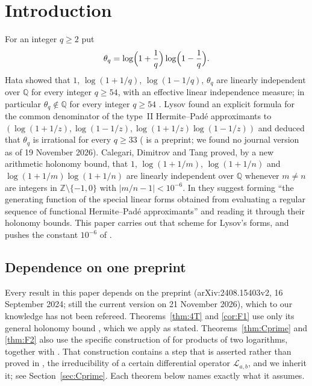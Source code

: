 \documentclass[11pt]{amsart}
\theoremstyle{definition}
\theoremstyle{remark}
\numberwithin{equation}{section}
\newcommand{\ZZ}{\mathbb{Z}}
\newcommand{\QQ}{\mathbb{Q}}
\begin{document}
\section{Introduction}\label{sec:intro}

For an integer $q\ge2$ put
\[
\theta_q=\log\Bigl(1+\frac1q\Bigr)\log\Bigl(1-\frac1q\Bigr).
\]
Hata \cite[Cor.~6.3]{Hat98} showed that $1$, $\log(1+1/q)$, $\log(1-1/q)$, $\theta_q$ are linearly independent over
$\QQ$ for every integer $q\ge54$, with an effective linear independence measure; in particular $\theta_q\notin\QQ$ for
every integer $q\ge54$ \cite[Thm.~0.1]{Hat98}. Lysov \cite{Lys18} found an explicit formula for the common
denominator of the type~II Hermite--Pad\'e approximants to $(\log(1+1/z),\log(1-1/z),\log(1+1/z)\log(1-1/z))$ and
deduced that $\theta_q$ is irrational for every $q\ge33$ \cite{Lys18,Lys19} (\cite{Lys18} is a preprint; we found no
journal version as of 19 November 2026). Calegari, Dimitrov and Tang
\cite[Thm.~C, Thm.~14.0.1]{CDT} proved, by a new arithmetic holonomy bound, that $1$, $\log(1+1/m)$, $\log(1+1/n)$ and
$\log(1+1/m)\log(1+1/n)$ are linearly independent over $\QQ$ whenever $m\ne n$ are integers in $\ZZ\setminus\{-1,0\}$
with $|m/n-1|<10^{-6}$. In \cite[\S15.1.10]{CDT} they suggest forming ``the generating function of the special linear
forms obtained from evaluating a regular sequence of functional Hermite--Pad\'e approximants'' and reading it through
their holonomy bounds. This paper carries out that scheme for Lysov's forms, and pushes the constant $10^{-6}$ of
\cite[Thm.~C]{CDT}.

\subsection*{Dependence on one preprint}
Every result in this paper depends on the preprint \cite{CDT} (arXiv:2408.15403v2, 16 September 2024; still the current
version on 21 November 2026), which to our knowledge has not been refereed. Theorems~\ref{thm:4T} and
\ref{cor:F1} use only its general holonomy bound \cite[Thm.~7.0.1]{CDT}, which we apply as stated.
Theorems~\ref{thm:Cprime} and \ref{thm:F2} also use the specific construction of \cite[\S14]{CDT} for products of two
logarithms, together with \cite[Thm.~6.0.2, Cor.~9.0.19, Lemma~12.0.1]{CDT}. That construction contains a step that
is asserted rather than proved in \cite{CDT}, the irreducibility of a certain differential operator
$\mathcal L_{a,b}$, and we inherit it; see Section~\ref{sec:Cprime}. Each theorem below names exactly what it assumes.
\end{document}
